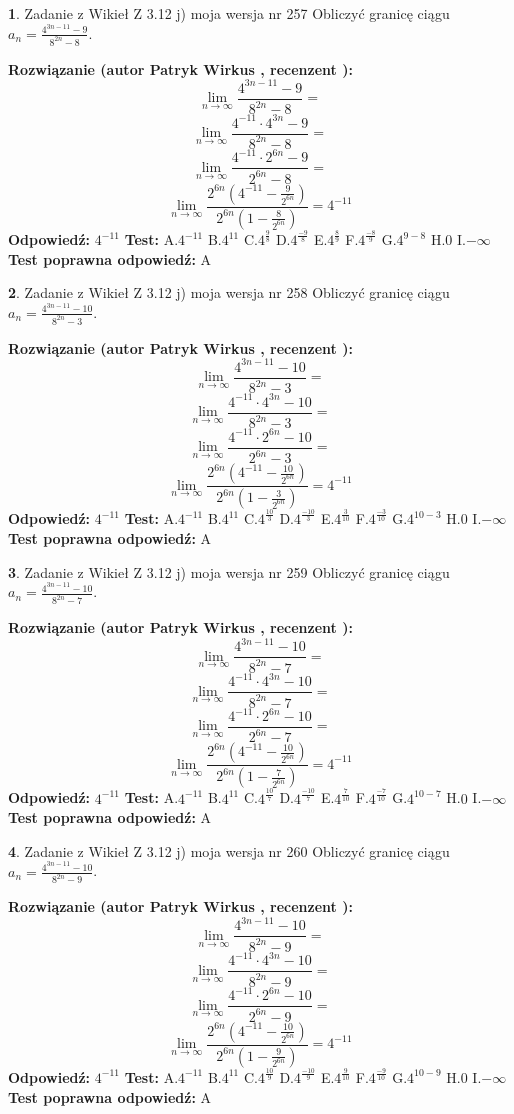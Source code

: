 \documentclass[12pt, a4paper]{article}
\theoremstyle{definition} %
\newtheorem{zad}{}
\newcommand{\zadStart}[1]{\begin{zad}#1\newline}
\newcommand{\zadStop}{\end{zad}}
\newcommand{\rozwStart}[2]{\noindent \textbf{Rozwiązanie (autor #1 , recenzent #2): }\newline}
\newcommand{\rozwStop}{\newline}
\newcommand{\odpStart}{\noindent \textbf{Odpowiedź:}\newline}
\newcommand{\odpStop}{\newline}
\newcommand{\testStart}{\noindent \textbf{Test:}\newline}
\newcommand{\testStop}{\newline}
\newcommand{\kluczStart}{\noindent \textbf{Test poprawna odpowiedź:}\newline}
\newcommand{\kluczStop}{\newline}
\begin{document}
\zadStart{Zadanie z Wikieł Z 3.12 j) moja wersja nr 257}
Obliczyć granicę ciągu $a_{n}=\frac{4^{3n-11}-9}{8^{2n}-8}$.
\zadStop
\rozwStart{Patryk Wirkus}{}
$$\lim\limits_{n\to\infty}\frac{4^{3n-11}-9}{8^{2n}-8}=$$
$$\lim\limits_{n\to\infty}\frac{4^{-11} \cdot 4^{3n}-9}{8^{2n}-8}=$$
$$\lim\limits_{n\to\infty}\frac{4^{-11} \cdot 2^{6n}-9}{2^{6n}-8}=$$
$$\lim\limits_{n\to\infty}\frac{2^{6n}(4^{-11} - \frac{9}{2^{6n}})}{2^{6n}(1-\frac{8}{2^{6n}})}= 4^{-11}$$
\rozwStop
\odpStart
$4^{-11}$
\odpStop
\testStart
A.$4^{-11}$
B.$4^{11}$
C.$4^{\frac{9}{8}}$
D.$4^{\frac{-9}{8}}$
E.$4^{\frac{8}{9}}$
F.$4^{\frac{-8}{9}}$
G.$4^{9-8}$
H.$0$
I.$-\infty$
\testStop
\kluczStart
A
\kluczStop



\zadStart{Zadanie z Wikieł Z 3.12 j) moja wersja nr 258}
Obliczyć granicę ciągu $a_{n}=\frac{4^{3n-11}-10}{8^{2n}-3}$.
\zadStop
\rozwStart{Patryk Wirkus}{}
$$\lim\limits_{n\to\infty}\frac{4^{3n-11}-10}{8^{2n}-3}=$$
$$\lim\limits_{n\to\infty}\frac{4^{-11} \cdot 4^{3n}-10}{8^{2n}-3}=$$
$$\lim\limits_{n\to\infty}\frac{4^{-11} \cdot 2^{6n}-10}{2^{6n}-3}=$$
$$\lim\limits_{n\to\infty}\frac{2^{6n}(4^{-11} - \frac{10}{2^{6n}})}{2^{6n}(1-\frac{3}{2^{6n}})}= 4^{-11}$$
\rozwStop
\odpStart
$4^{-11}$
\odpStop
\testStart
A.$4^{-11}$
B.$4^{11}$
C.$4^{\frac{10}{3}}$
D.$4^{\frac{-10}{3}}$
E.$4^{\frac{3}{10}}$
F.$4^{\frac{-3}{10}}$
G.$4^{10-3}$
H.$0$
I.$-\infty$
\testStop
\kluczStart
A
\kluczStop



\zadStart{Zadanie z Wikieł Z 3.12 j) moja wersja nr 259}
Obliczyć granicę ciągu $a_{n}=\frac{4^{3n-11}-10}{8^{2n}-7}$.
\zadStop
\rozwStart{Patryk Wirkus}{}
$$\lim\limits_{n\to\infty}\frac{4^{3n-11}-10}{8^{2n}-7}=$$
$$\lim\limits_{n\to\infty}\frac{4^{-11} \cdot 4^{3n}-10}{8^{2n}-7}=$$
$$\lim\limits_{n\to\infty}\frac{4^{-11} \cdot 2^{6n}-10}{2^{6n}-7}=$$
$$\lim\limits_{n\to\infty}\frac{2^{6n}(4^{-11} - \frac{10}{2^{6n}})}{2^{6n}(1-\frac{7}{2^{6n}})}= 4^{-11}$$
\rozwStop
\odpStart
$4^{-11}$
\odpStop
\testStart
A.$4^{-11}$
B.$4^{11}$
C.$4^{\frac{10}{7}}$
D.$4^{\frac{-10}{7}}$
E.$4^{\frac{7}{10}}$
F.$4^{\frac{-7}{10}}$
G.$4^{10-7}$
H.$0$
I.$-\infty$
\testStop
\kluczStart
A
\kluczStop



\zadStart{Zadanie z Wikieł Z 3.12 j) moja wersja nr 260}
Obliczyć granicę ciągu $a_{n}=\frac{4^{3n-11}-10}{8^{2n}-9}$.
\zadStop
\rozwStart{Patryk Wirkus}{}
$$\lim\limits_{n\to\infty}\frac{4^{3n-11}-10}{8^{2n}-9}=$$
$$\lim\limits_{n\to\infty}\frac{4^{-11} \cdot 4^{3n}-10}{8^{2n}-9}=$$
$$\lim\limits_{n\to\infty}\frac{4^{-11} \cdot 2^{6n}-10}{2^{6n}-9}=$$
$$\lim\limits_{n\to\infty}\frac{2^{6n}(4^{-11} - \frac{10}{2^{6n}})}{2^{6n}(1-\frac{9}{2^{6n}})}= 4^{-11}$$
\rozwStop
\odpStart
$4^{-11}$
\odpStop
\testStart
A.$4^{-11}$
B.$4^{11}$
C.$4^{\frac{10}{9}}$
D.$4^{\frac{-10}{9}}$
E.$4^{\frac{9}{10}}$
F.$4^{\frac{-9}{10}}$
G.$4^{10-9}$
H.$0$
I.$-\infty$
\testStop
\kluczStart
A
\kluczStop
\end{document}
